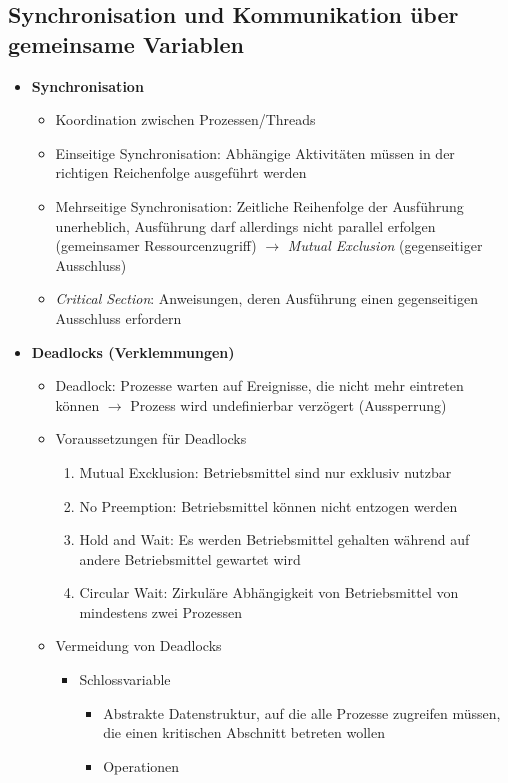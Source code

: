 \subsection{Synchronisation und Kommunikation über gemeinsame Variablen}
\begin{itemize}
	\item \textbf{Synchronisation}
	\begin{itemize}
		\item Koordination zwischen Prozessen/Threads
		\item Einseitige Synchronisation: Abhängige Aktivitäten müssen in der richtigen Reichenfolge ausgeführt werden
		\item Mehrseitige Synchronisation: Zeitliche Reihenfolge der Ausführung unerheblich, Ausführung darf allerdings nicht parallel erfolgen (gemeinsamer Ressourcenzugriff) \(\rightarrow\) \textit{Mutual Exclusion} (gegenseitiger Ausschluss)
		\item \textit{Critical Section}: Anweisungen, deren Ausführung einen gegenseitigen Ausschluss erfordern
	\end{itemize}
	\item \textbf{Deadlocks (Verklemmungen)}
	\begin{itemize}
		\item Deadlock: Prozesse warten auf Ereignisse, die nicht mehr eintreten können \(\rightarrow\) Prozess wird undefinierbar verzögert (Aussperrung)
		\item Voraussetzungen für Deadlocks
		\begin{enumerate}
			\item Mutual Excklusion: Betriebsmittel sind nur exklusiv nutzbar
			\item No Preemption: Betriebsmittel können nicht entzogen werden
			\item Hold and Wait: Es werden Betriebsmittel gehalten während auf andere Betriebsmittel gewartet wird
			\item Circular Wait: Zirkuläre Abhängigkeit von Betriebsmittel von mindestens zwei Prozessen
		\end{enumerate}
		\item Vermeidung von Deadlocks
		\begin{itemize}
			\item Schlossvariable
			\begin{itemize}
				\item Abstrakte Datenstruktur, auf die alle Prozesse zugreifen müssen, die einen kritischen Abschnitt betreten wollen
				\item Operationen

\end{itemize}
\end{itemize}
\end{itemize}
\end{itemize}
